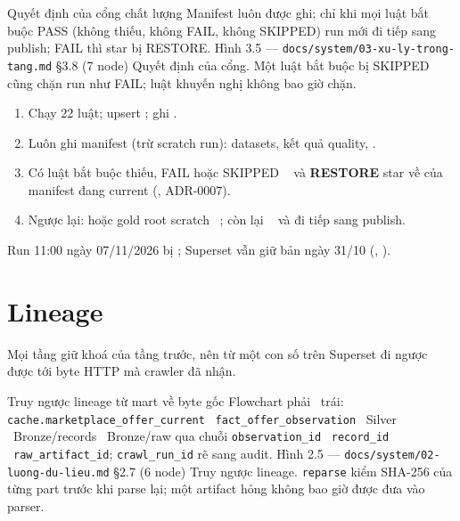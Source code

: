   {Quyết định của cổng chất lượng}
  {Manifest luôn được ghi; chỉ khi mọi luật bắt buộc PASS (không thiếu, không FAIL, không SKIPPED) run mới đi tiếp sang publish; FAIL thì star bị RESTORE.}
  {Hình 3.5 — \texttt{docs/system/03-xu-ly-trong-tang.md} §3.8 (7 node)}
  {Quyết định của cổng. Một luật bắt buộc bị SKIPPED cũng chặn run như FAIL; luật khuyến nghị không bao giờ chặn.}

\begin{enumerate}
  \item Chạy 22 luật; upsert ; ghi .
  \item Luôn ghi manifest (trừ scratch run): datasets, kết quả quality, .
  \item Có luật bắt buộc thiếu, FAIL hoặc SKIPPED \ra\  và \textbf{RESTORE} star về  của manifest đang current
        (, ADR-0007).
  \item Ngược lại:  hoặc gold root scratch \ra\ ; còn lại \ra\  và đi tiếp sang publish.
\end{enumerate}

\begin{notebox}
Run 11:00 ngày 07/11/2026 bị ; Superset vẫn giữ bản ngày 31/10
(, ).
\end{notebox}

\section{Lineage}\label{sec:lineage}
Mọi tầng giữ khoá của tầng trước, nên từ một con số trên Superset đi ngược được tới byte HTTP mà crawler đã nhận.

  {Truy ngược lineage từ mart về byte gốc}
  {Flowchart phải \ra\ trái: \texttt{cache.marketplace\_offer\_current} \ra\ \texttt{fact\_offer\_observation} \ra\ Silver \ra\ Bronze/records \ra\ Bronze/raw qua chuỗi \texttt{observation\_id} \ra\ \texttt{record\_id} \ra\ \texttt{raw\_artifact\_id}; \texttt{crawl\_run\_id} rẽ sang audit.}
  {Hình 2.5 — \texttt{docs/system/02-luong-du-lieu.md} §2.7 (6 node)}
  {Truy ngược lineage. \texttt{reparse} kiểm SHA-256 của từng part trước khi parse lại; một artifact hỏng không bao giờ được đưa vào parser.}

